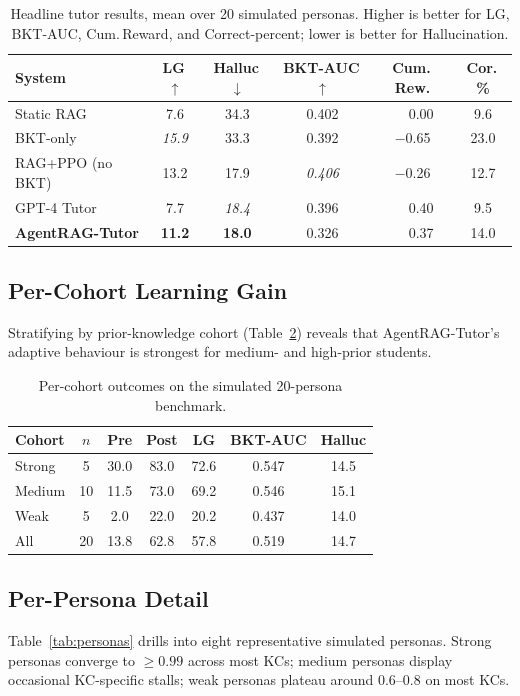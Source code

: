 \documentclass[conference]{IEEEtran}
\begin{document}
\begin{table}[H]
\caption{Headline tutor results, mean over 20 simulated personas.
Higher is better for LG, BKT-AUC, Cum.\,Reward, and Correct-percent;
lower is better for Hallucination.}
\label{tab:baselines}
\centering
\footnotesize
\setlength{\tabcolsep}{3pt}
\begin{tabular}{l c c c c c}
\toprule
System & LG\,$\uparrow$ & Halluc\,$\downarrow$ & BKT-AUC\,$\uparrow$ &
Cum.\,Rew. & Cor.\,\% \\
\midrule
Static RAG             & 7.6 & 34.3 & 0.402 & $\phantom{-}$0.00  & 9.6 \\
BKT-only               & \emph{15.9} & 33.3 & 0.392 & $-$0.65 & 23.0 \\
RAG+PPO (no BKT)       & 13.2 & 17.9 & \emph{0.406} & $-$0.26 & 12.7 \\
GPT-4 Tutor            & 7.7 & \emph{18.4} & 0.396 & $\phantom{-}$0.40 & 9.5 \\
\textbf{AgentRAG-Tutor}& \textbf{11.2} & \textbf{18.0} & 0.326 & $\phantom{-}$0.37 & 14.0 \\
\bottomrule
\end{tabular}
\end{table}

\subsection{Per-Cohort Learning Gain}
Stratifying by prior-knowledge cohort (Table~\ref{tab:cohort})
reveals that AgentRAG-Tutor's adaptive behaviour is strongest for
medium- and high-prior students.

\begin{table}[H]
\caption{Per-cohort outcomes on the simulated 20-persona benchmark.}
\label{tab:cohort}
\centering
\footnotesize
\setlength{\tabcolsep}{4pt}
\begin{tabular}{l c c c c c c}
\toprule
Cohort & $n$ & Pre & Post & LG & BKT-AUC & Halluc \\
\midrule
Strong & 5  & 30.0 & 83.0 & 72.6 & 0.547 & 14.5 \\
Medium & 10 & 11.5 & 73.0 & 69.2 & 0.546 & 15.1 \\
Weak   & 5  &  2.0 & 22.0 & 20.2 & 0.437 & 14.0 \\
\midrule
All    & 20 & 13.8 & 62.8 & 57.8 & 0.519 & 14.7 \\
\bottomrule
\end{tabular}
\end{table}

\subsection{Per-Persona Detail}
Table~\ref{tab:personas} drills into eight representative simulated
personas. Strong personas converge to $\geq 0.99$ across most KCs;
medium personas display occasional KC-specific stalls; weak personas
plateau around 0.6--0.8 on most KCs.
\end{document}
